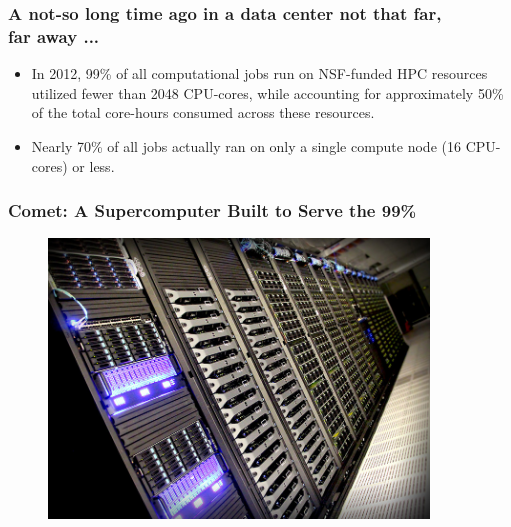 \documentclass{beamer}
\begin{document}
\begin{frame}
   \frametitle{A not-so long time ago in a data center not that far, \\
               far away ...}
   \begin{itemize}
      \setlength\itemsep{1.0em}
      \item In 2012, 99\% of all computational jobs run on NSF-funded
         HPC resources utilized fewer than 2048 CPU-cores, while
         accounting for approximately 50\% of the total core-hours
         consumed across these resources.
      \item Nearly 70\% of all jobs actually ran on only a single
         compute node (16 CPU-cores) or less.
   \end{itemize}
\end{frame}

\begin{frame}
   \frametitle{Comet: A Supercomputer Built to Serve the 99\%}
   \vspace{-1.0em}
   \begin{figure}[htbp]
      \includegraphics[width=0.9\textwidth]{images/comet.jpg}
   \end{figure}
\end{frame}
\end{document}
